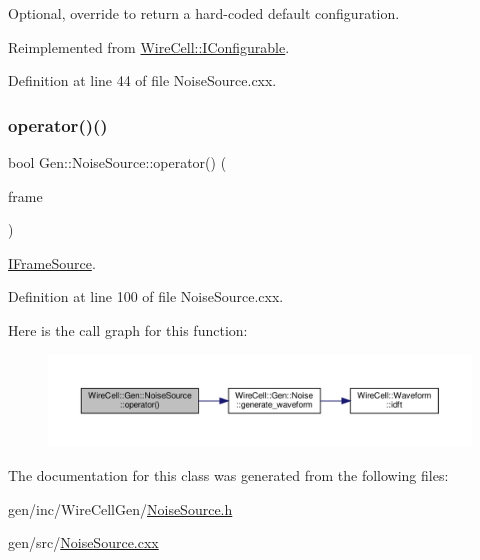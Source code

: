 Optional, override to return a hard-\/coded default configuration. 



Reimplemented from \hyperlink{class_wire_cell_1_1_i_configurable_a54841b2da3d1ea02189478bff96f7998}{Wire\+Cell\+::\+I\+Configurable}.



Definition at line 44 of file Noise\+Source.\+cxx.

\mbox{\label{class_wire_cell_1_1_gen_1_1_noise_source_a68dbab9d5fb03dc6477ca1213c288799}} 
\subsubsection{\texorpdfstring{operator()()}{operator()()}}
{\footnotesize\ttfamily bool Gen\+::\+Noise\+Source\+::operator() (\begin{DoxyParamCaption}\item[{\hyperlink{class_wire_cell_1_1_i_data_aff870b3ae8333cf9265941eef62498bc}{I\+Frame\+::pointer} \&}]{frame }\end{DoxyParamCaption})\hspace{0.3cm}{\ttfamily [virtual]}}



\hyperlink{class_wire_cell_1_1_i_frame_source}{I\+Frame\+Source}. 



Definition at line 100 of file Noise\+Source.\+cxx.

Here is the call graph for this function\+:
\nopagebreak
\begin{figure}[H]
\begin{center}
\leavevmode
\includegraphics[width=350pt]{class_wire_cell_1_1_gen_1_1_noise_source_a68dbab9d5fb03dc6477ca1213c288799_cgraph}
\end{center}
\end{figure}


The documentation for this class was generated from the following files\+:\begin{DoxyCompactItemize}
\item 
gen/inc/\+Wire\+Cell\+Gen/\hyperlink{_noise_source_8h}{Noise\+Source.\+h}\item 
gen/src/\hyperlink{_noise_source_8cxx}{Noise\+Source.\+cxx}\end{DoxyCompactItemize}
